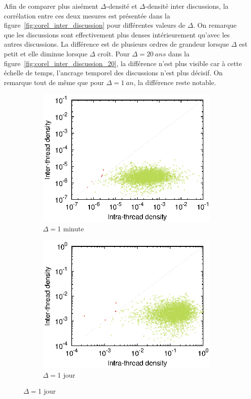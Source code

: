 Afin de comparer plus aisément $\Delta$-densité et $\Delta$-densité inter discussions, la corrélation entre ces deux mesures est présentée dans la figure~\ref{fig:corel_inter_discussion} pour différentes valeurs de $\Delta$.
On remarque que les discussions sont effectivement plus denses intérieurement qu'avec les autres discussions.
La différence est de plusieurs ordres de grandeur lorsque $\Delta$ est petit et elle diminue lorsque $\Delta$ croît.
Pour $\Delta=20\ ans$ dans la figure~\ref{fig:corel_inter_discussion_20}, la différence n'est plus visible car à cette échelle de temps, l'ancrage temporel des discussions n'est plus décisif.
On remarque tout de même que pour $\Delta=1\ an$, la différence reste notable.
 

\begin{figure}
\centering
	\begin{subfigure}{0.48\textwidth}
		\includegraphics[width=\linewidth]{img/mailing/DensityCurve/120/mean.eps}
		\caption{$\Delta= $1 minute}		
	\end{subfigure}
	\begin{subfigure}{0.48\textwidth}
		\includegraphics[width=\linewidth]{img/mailing/DensityCurve/172800/mean.eps}
		\caption{$\Delta= $1 jour}		
	\end{subfigure}
	

\end{figure}
